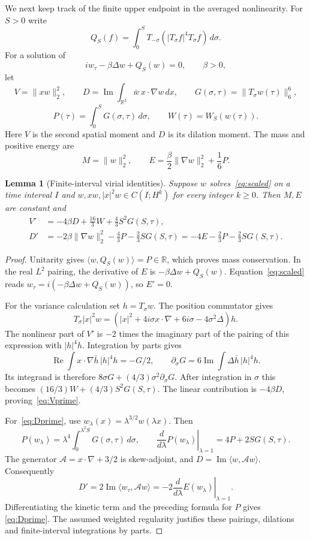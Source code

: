 \documentclass[11pt]{article}
\newcommand{\R}{\mathbb R}
\numberwithin{equation}{section}
\newtheorem{lemma}{Lemma}[section]
\begin{document}
We next keep track of the finite upper endpoint in the averaged nonlinearity.
For $S>0$ write
\[
 Q_S(f)=\int_0^S T_{-\sigma}(|T_\sigma f|^4T_\sigma f)\,d\sigma.
\]
For a solution of
\begin{equation}\label{eq:scaled}
 iw_\tau-\beta\Delta w+Q_S(w)=0,\qquad \beta>0,
\end{equation}
let
\[
 V=\|xw\|_2^2,\qquad
 D=\operatorname{Im}\int_{\R^3}\bar w\,x\cdot\nabla w\,dx,
 \qquad G(\sigma,\tau)=\|T_\sigma w(\tau)\|_6^6,
\]
\[
 P(\tau)=\int_0^S G(\sigma,\tau)\,d\sigma,
 \qquad W(\tau)=W_S(w(\tau)).
\]
Here $V$ is the second spatial moment and $D$ is its dilation moment.
The mass and positive energy are
\begin{equation}\label{eq:energy}
 M=\|w\|_2^2,\qquad
 E=\frac\beta2\|\nabla w\|_2^2+\frac16P.
\end{equation}

\begin{lemma}[Finite-interval virial identities]\label{lem:virial}
Suppose $w$ solves~\eqref{eq:scaled} on a time interval $I$ and
$w,xw,|x|^2w\in C(I;H^k)$ for every integer $k\ge0$.
Then $M,E$ are constant and
\begin{align}
 V'&=-4\beta D+\frac{16}{3}W+\frac43S^2G(S,\tau),\label{eq:Vprime}\\
 D'&=-2\beta\|\nabla w\|_2^2-\frac43P-\frac23SG(S,\tau)
     =-4E-\frac23P-\frac23SG(S,\tau).\label{eq:Dprime}
\end{align}
\end{lemma}

\begin{proof}
Unitarity gives $\langle w,Q_S(w)\rangle=P\in\R$, which proves mass
conservation. In the real $L^2$ pairing, the derivative of $E$ is
$-\beta\Delta w+Q_S(w)$. Equation~\eqref{eq:scaled} reads
$w_\tau=i(-\beta\Delta w+Q_S(w))$, so $E'=0$.

For the variance calculation set $h=T_\sigma w$. The position commutator gives
\[
 T_\sigma|x|^2w=(|x|^2+4i\sigma x\cdot\nabla+6i\sigma-4\sigma^2\Delta)h.
\]
The nonlinear part of $V'$ is $-2$ times the imaginary part of the pairing
of this expression with $|h|^4h$. Integration by parts gives
\[
 \operatorname{Re}\int x\cdot\nabla\bar h\,|h|^4h=-G/2,
 \qquad \partial_\sigma G=6\operatorname{Im}\int\Delta\bar h\,|h|^4h.
\]
Its integrand is therefore $8\sigma G+(4/3)\sigma^2\partial_\sigma G$.
After integration in $\sigma$ this becomes
$(16/3)W+(4/3)S^2G(S,\tau)$. The linear contribution is $-4\beta D$,
proving~\eqref{eq:Vprime}.

For~\eqref{eq:Dprime}, use $w_\lambda(x)=\lambda^{3/2}w(\lambda x)$.
Then
\[
 P(w_\lambda)=\lambda^4\int_0^{\lambda^2S}G(\sigma,\tau)\,d\sigma,
 \qquad \left.\frac{d}{d\lambda}P(w_\lambda)\right|_{\lambda=1}
       =4P+2SG(S,\tau).
\]
The generator $\mathcal A=x\cdot\nabla+3/2$ is skew-adjoint, and
$D=\operatorname{Im}\langle w,\mathcal Aw\rangle$. Consequently
\[
 D'=2\operatorname{Im}\langle w_\tau,\mathcal Aw\rangle
    =-2\left.\frac{d}{d\lambda}E(w_\lambda)\right|_{\lambda=1}.
\]
Differentiating the kinetic term and the preceding formula for $P$ gives
\eqref{eq:Dprime}. The assumed weighted regularity justifies these pairings,
dilations and finite-interval integrations by parts.
\end{proof}
\end{document}
